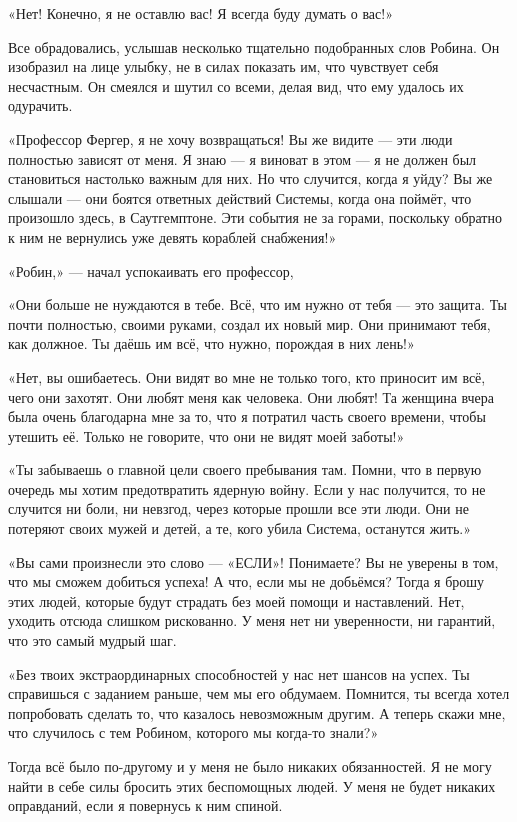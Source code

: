 \documentclass[a4paper,12pt]{book}
\begin{document}
«Нет! Конечно, я не оставлю вас! Я всегда буду думать о вас!»
\par
Все обрадовались, услышав несколько тщательно подобранных слов Робина. Он изобразил на лице улыбку, не в силах показать им, что чувствует себя несчастным. Он смеялся и шутил со всеми, делая вид, что ему удалось их одурачить.\\
\par
«Профессор Фергер, я не хочу возвращаться! Вы же видите — эти люди полностью зависят от меня. Я знаю — я виноват в этом — я не должен был становиться настолько важным для них. Но что случится, когда я уйду? Вы же слышали — они боятся ответных действий Системы, когда она поймёт, что произошло здесь, в Саутгемптоне. Эти события не за горами, поскольку обратно к ним не вернулись уже девять кораблей снабжения!»
\par
«Робин,» — начал успокаивать его профессор,
\par
«Они больше не нуждаются в тебе. Всё, что им нужно от тебя — это защита. Ты почти полностью, своими руками, создал их новый мир. Они принимают тебя, как должное. Ты даёшь им всё, что нужно, порождая в них лень!»
\par
«Нет, вы ошибаетесь. Они видят во мне не только того, кто приносит им всё, чего они захотят. Они любят меня как человека. Они любят! Та женщина вчера была очень благодарна мне за то, что я потратил часть своего времени, чтобы утешить её. Только не говорите, что они не видят моей заботы!»
\par
«Ты забываешь о главной цели своего пребывания там. Помни, что в первую очередь мы хотим предотвратить ядерную войну. Если у нас получится, то не случится ни боли, ни невзгод, через которые прошли все эти люди. Они не потеряют своих мужей и детей, а те, кого убила Система, останутся жить.»
\par
«Вы сами произнесли это слово — «ЕСЛИ»! Понимаете? Вы не уверены в том, что мы сможем добиться успеха! А что, если мы не добьёмся? Тогда я брошу этих людей, которые будут страдать без моей помощи и наставлений. Нет, уходить отсюда слишком рискованно. У меня нет ни уверенности, ни гарантий, что это самый мудрый шаг.
\par
«Без твоих экстраординарных способностей у нас нет шансов на успех. Ты справишься с заданием раньше, чем мы его обдумаем. Помнится, ты всегда хотел попробовать сделать то, что казалось невозможным другим. А теперь скажи мне, что случилось с тем Робином, которого мы когда-то знали?»
\par
Тогда всё было по-другому и у меня не было никаких обязанностей. Я не могу найти в себе силы бросить этих беспомощных людей. У меня не будет никаких оправданий, если я повернусь к ним спиной.
\end{document}
